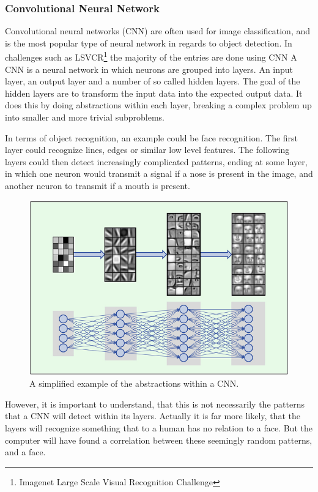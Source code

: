\subsubsection{Convolutional Neural Network}
Convolutional neural networks (CNN) are often used for image classification, and is the most popular type of neural network in regards to object detection.
In challenges such as LSVCR\footnote{Imagenet Large Scale Visual Recognition Challenge} the majority of the entries are done using CNN %
A CNN is a neural network in which neurons are grouped into layers.
An input layer, an output layer and a number of so called hidden layers.
The goal of the hidden layers are to transform the input data into the expected output data.
It does this by doing abstractions within each layer, breaking a complex problem up into smaller and more trivial subproblems.

In terms of object recognition, an example could be face recognition.
The first layer could recognize lines, edges or similar low level features.
The following layers could then detect increasingly complicated patterns, ending at some layer, in which one neuron would transmit a signal if a nose is present in the image, and another neuron to transmit if a mouth is present.



\begin{figure}[H]
	\centering
	\includegraphics[scale=0.40]{images/cnn_face.jpg}
	\caption{
		A simplified example of the abstractions within a CNN.
	}
	\label{fig:face_cnn}
\end{figure}
 
However, it is important to understand, that this is not necessarily the patterns that a CNN will detect within its layers.
Actually it is far more likely, that the layers will recognize something that to a human has no relation to a face.
But the computer will have found a correlation between these seemingly random patterns, and a face.

